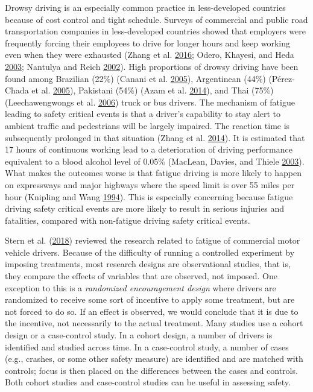\documentclass[12pt]{book}
\numberwithin{equation}{chapter}
\begin{document}
Drowsy driving is an especially common practice in less-developed countries because of cost control and tight schedule. Surveys of commercial and public road transportation companies in less-developed countries showed that employers were frequently forcing their employees to drive for longer hours and keep working even when they were exhausted (Zhang et al. \protect\hyperlink{ref-zhang2016traffic}{2016}; Odero, Khayesi, and Heda \protect\hyperlink{ref-odero2003road}{2003}; Nantulya and Reich \protect\hyperlink{ref-nantulya2002neglected}{2002}). High proportions of drowsy driving have been found among Brazilian (22\%) (Canani et al. \protect\hyperlink{ref-canani2005prevalence}{2005}), Argentinean (44\%) (Pérez-Chada et al. \protect\hyperlink{ref-perez2005sleep}{2005}), Pakistani (54\%) (Azam et al. \protect\hyperlink{ref-azam2014comparison}{2014}), and Thai (75\%) (Leechawengwongs et al. \protect\hyperlink{ref-leechawengwongs2006role}{2006}) truck or bus drivers. The mechanism of fatigue leading to safety critical events is that a driver's capability to stay alert to ambient traffic and pedestrians will be largely impaired. The reaction time is subsequently prolonged in that situation (Zhang et al. \protect\hyperlink{ref-zhang2014study}{2014}). It is estimated that 17 hours of continuous working lead to a deterioration of driving performance equivalent to a blood alcohol level of 0.05\% (MacLean, Davies, and Thiele \protect\hyperlink{ref-maclean2003hazards}{2003}). What makes the outcomes worse is that fatigue driving is more likely to happen on expressways and major highways where the speed limit is over 55 miles per hour (Knipling and Wang \protect\hyperlink{ref-knipling1994crashes}{1994}). This is especially concerning because fatigue driving safety critical events are more likely to result in serious injuries and fatalities, compared with non-fatigue driving safety critical events.

Stern et al. (\protect\hyperlink{ref-stern2018data}{2018}) reviewed the research related to fatigue of commercial motor vehicle drivers. Because of the difficulty of running a controlled experiment by imposing treatments, most research designs are observational studies, that is, they compare the effects of variables that are observed, not imposed. One exception to this is a \emph{randomized encouragement design} where drivers are randomized to receive some sort of incentive to apply some treatment, but are not forced to do so. If an effect is observed, we would conclude that it is due to the incentive, not necessarily to the actual treatment. Many studies use a cohort design or a case-control study. In a cohort design, a number of drivers is identified and studied across time. In a case-control study, a number of cases (e.g., crashes, or some other safety measure) are identified and are matched with controls; focus is then placed on the differences between the cases and controls. Both cohort studies and case-control studies can be useful in assessing safety.
\end{document}
